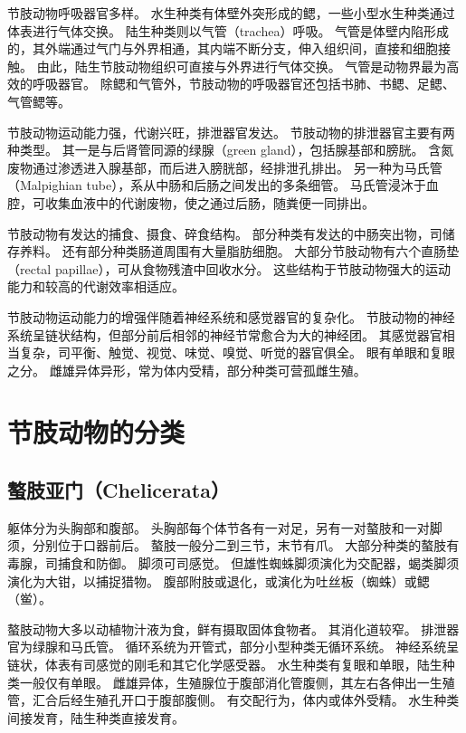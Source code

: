 \documentclass[11pt]{article}
\begin{document}
\newline

节肢动物呼吸器官多样。
水生种类有体壁外突形成的鳃，一些小型水生种类通过体表进行气体交换。
陆生种类则以气管（trachea）呼吸。
气管是体壁内陷形成的，其外端通过气门与外界相通，其内端不断分支，伸入组织间，直接和细胞接触。
由此，陆生节肢动物组织可直接与外界进行气体交换。
气管是动物界最为高效的呼吸器官。
除鳃和气管外，节肢动物的呼吸器官还包括书肺、书鳃、足鳃、气管鳃等。

\newline

节肢动物运动能力强，代谢兴旺，排泄器官发达。
节肢动物的排泄器官主要有两种类型。
其一是与后肾管同源的绿腺（green gland），包括腺基部和膀胱。
含氮废物通过渗透进入腺基部，而后进入膀胱部，经排泄孔排出。
另一种为马氏管（Malpighian tube），系从中肠和后肠之间发出的多条细管。
马氏管浸沐于血腔，可收集血液中的代谢废物，使之通过后肠，随粪便一同排出。

\newline

节肢动物有发达的捕食、摄食、碎食结构。
部分种类有发达的中肠突出物，司储存养料。
还有部分种类肠道周围有大量脂肪细胞。
大部分节肢动物有六个直肠垫（rectal papillae），可从食物残渣中回收水分。
这些结构于节肢动物强大的运动能力和较高的代谢效率相适应。

\newline

节肢动物运动能力的增强伴随着神经系统和感觉器官的复杂化。
节肢动物的神经系统呈链状结构，但部分前后相邻的神经节常愈合为大的神经团。
其感觉器官相当复杂，司平衡、触觉、视觉、味觉、嗅觉、听觉的器官俱全。
眼有单眼和复眼之分。
雌雄异体异形，常为体内受精，部分种类可营孤雌生殖。

\section{节肢动物的分类}
\subsection{螯肢亚门（Chelicerata）}
躯体分为头胸部和腹部。
头胸部每个体节各有一对足，另有一对螯肢和一对脚须，分别位于口器前后。
螯肢一般分二到三节，末节有爪。
大部分种类的螯肢有毒腺，司捕食和防御。
脚须可司感觉。
但雄性蜘蛛脚须演化为交配器，蝎类脚须演化为大钳，以捕捉猎物。
腹部附肢或退化，或演化为吐丝板（蜘蛛）或鳃（鲎）。

\newline

螯肢动物大多以动植物汁液为食，鲜有摄取固体食物者。
其消化道较窄。
排泄器官为绿腺和马氏管。
循环系统为开管式，部分小型种类无循环系统。
神经系统呈链状，体表有司感觉的刚毛和其它化学感受器。
水生种类有复眼和单眼，陆生种类一般仅有单眼。
雌雄异体，生殖腺位于腹部消化管腹侧，其左右各伸出一生殖管，汇合后经生殖孔开口于腹部腹侧。
有交配行为，体内或体外受精。
水生种类间接发育，陆生种类直接发育。
\end{document}
